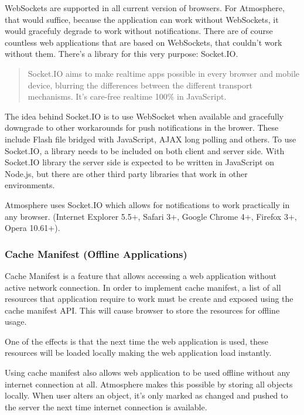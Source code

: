 WebSockets are supported in all current version of browsers. For Atmosphere, that would suffice, because the application can work without WebSockets, it would gracefuly degrade to work without notifications. There are of course countless web applications that are based on WebSockets, that couldn’t work without them. There’s a library for this very purpose: Socket.IO. \citep{socketio}

\begin{quotation}
Socket.IO aims to make realtime apps possible in every browser and mobile device, blurring the differences between the different transport mechanisms. It's care-free realtime 100\% in JavaScript. \citep{socketio}
\end{quotation}

The idea behind Socket.IO is to use WebSocket when available and gracefully downgrade to other workarounds for push notifications in the brower. These include Flash file bridged with JavaScript, AJAX long polling and others. To use Socket.IO, a library needs to be included on both client and server side. With Socket.IO library the server side is expected to be written in JavaScript on Node.js, but there are other third party libraries that work in other environments.

Atmosphere uses Socket.IO which allows for notifications to work practically in any browser. (Internet Explorer 5.5+, Safari 3+, Google Chrome 4+, Firefox 3+, Opera 10.61+).

\subsubsection{Cache Manifest (Offline Applications)}

Cache Manifest is a feature that allows accessing a web application without active network connection. In order to implement cache manifest, a list of all resources that application require to work must be create and exposed using the cache manifest API. This will cause browser to store the resources for offline usage.

One of the effects is that the next time the web application is used, these resources will be loaded locally making the web application load instantly.

Using cache manifest also allows web application to be used offline without any internet connection at all. Atmosphere makes this possible by storing all objects locally. When user alters an object, it’s only marked as changed and pushed to the server the next time internet connection is available. 

